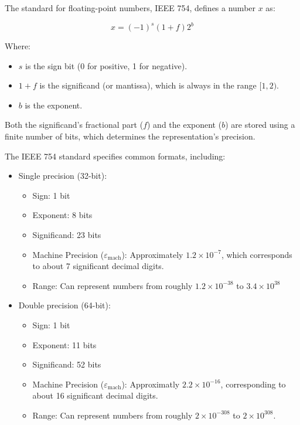 The standard for floating-point numbers, IEEE 754, defines a number $x$ as:

\begin{equation}
    x = (-1)^{s} (1 + f) 2^{b}
\end{equation}

Where:

\begin{itemize}
    \item $s$ is the sign bit (0 for positive, 1 for negative).
    \item $1 + f$ is the significand (or mantissa), which is always in the range $[1, 2)$.
    \item $b$ is the exponent.
\end{itemize}

Both the significand's fractional part ($f$) and the exponent ($b$) are stored using a finite number of bits, which determines the representation's precision.

The IEEE 754 standard specifies common formats, including:

\begin{itemize}
    \item Single precision (32-bit):
    \begin{itemize}
        \item Sign: 1 bit
        \item Exponent: 8 bits
        \item Significand: 23 bits
        \item Machine Precision ($\varepsilon_\text{mach}$): Approximately $1.2 \times 10^{-7}$, which corresponds to about 7 significant decimal digits.
        \item Range: Can represent numbers from roughly $1.2 \times 10^{-38}$ to $3.4 \times 10^{38}$
    \end{itemize}
    \item Double precision (64-bit):
    \begin{itemize}
        \item Sign: 1 bit
        \item Exponent: 11 bits
        \item Significand: 52 bits
        \item Machine Precision ($\varepsilon_\text{mach}$): Approximatly $2.2 \times 10^{-16}$, corresponding to about 16 significant decimal digits.
        \item Range: Can represent numbers from roughly $2 \times 10^{-308}$ to $2 \times 10^{308}$.
    \end{itemize}
\end{itemize}

